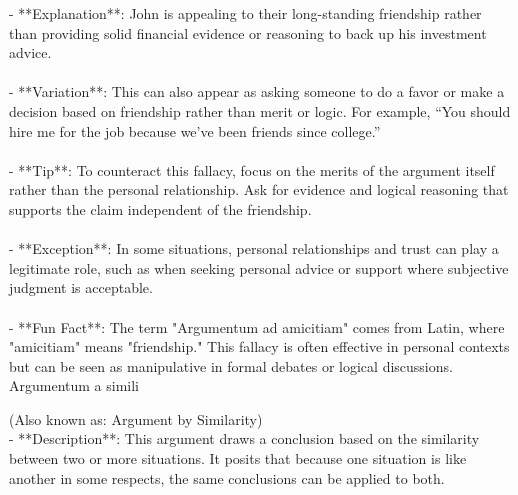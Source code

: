 \documentclass[a4paper,12pt,single,pdftex]{scrbook}
\begin{document}
    
        - **Explanation**: John is appealing to their long-standing friendship rather than providing solid financial evidence or reasoning to back up his investment advice.
    \\

    
      
    \\

    
      - **Variation**: This can also appear as asking someone to do a favor or make a decision based on friendship rather than merit or logic. For example, “You should hire me for the job because we’ve been friends since college.”
    \\

    
      
    \\

    
      - **Tip**: To counteract this fallacy, focus on the merits of the argument itself rather than the personal relationship. Ask for evidence and logical reasoning that supports the claim independent of the friendship.
    \\

    
      
    \\

    
      - **Exception**: In some situations, personal relationships and trust can play a legitimate role, such as when seeking personal advice or support where subjective judgment is acceptable.
    \\

    
      
    \\

    
      - **Fun Fact**: The term "Argumentum ad amicitiam" comes from Latin, where "amicitiam" means "friendship." This fallacy is often effective in personal contexts but can be seen as manipulative in formal debates or logical discussions.
    \\

  

Argumentum a simili
    
      (Also known as: Argument by Similarity)
    \\

  
    
      - **Description**: This argument draws a conclusion based on the similarity between two or more situations. It posits that because one situation is like another in some respects, the same conclusions can be applied to both.
    \\
\end{document}
